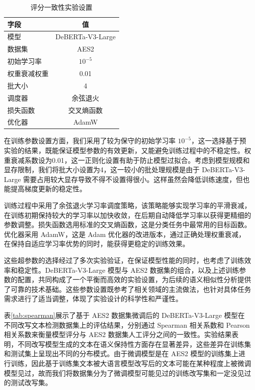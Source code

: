 \begin{table}[htbp]
\centering
\caption{评分一致性实验设置} \label{tab:score-set}
\begin{tabular}{lc}
\toprule
\textbf{字段}   & \textbf{值}   \\ \midrule
模型            & DeBERTa-V3-Large \cite{he2023debertav3improvingdebertausing} \\
数据集          & AES2 \cite{learning-agency-lab-automated-essay-scoring-2}     \\
初始学习率       & $10^{-5}$        \\
权重衰减权重     & 0.01             \\
批大小          & 4                \\
调度器          & 余弦退火           \\
损失函数        & 交叉熵函数         \\
优化器          & AdamW            \\ \bottomrule
\end{tabular}
\end{table}

在训练参数设置方面，我们采用了较为保守的初始学习率 $10^{-5}$，这一选择基于预实验的结果，既能保证模型参数的有效更新，又能避免训练过程中的不稳定性。权重衰减系数设为0.01，这一正则化设置有助于防止模型过拟合。考虑到模型规模和显存限制，我们将批大小设置为4，这一较小的批处理规模是由于 DeBERTa-V3-Large 需要占用较大显存导致不得不设置得很小。这样虽然会降低训练速度，但也能提高梯度更新的稳定性。

训练过程中采用了余弦退火学习率调度策略，该策略能够实现学习率的平滑衰减，在训练初期保持较大的学习率以加快收敛，在后期自动降低学习率以获得更精细的参数调整。损失函数选用标准的交叉熵函数，这是分类任务中最常用的目标函数。优化器采用 AdamW，这是 Adam 优化器的改进版本，通过正确处理权重衰减，在保持自适应学习率优势的同时，能获得更稳定的训练效果。

这些超参数的选择经过了多次实验验证，在保证模型性能的同时，也考虑了训练效率和稳定性。DeBERTa-V3-Large 模型与 AES2 数据集的组合，以及上述训练参数的配置，共同构成了一个平衡而高效的实验设置，为后续的语义相似性分析提供了可靠的技术基础。这些参数设置既参考了相关领域的主流做法，也针对具体任务需求进行了适当调整，体现了实验设计的科学性和严谨性。

表\ref{tab:spearman}展示了基于 AES2 数据集微调后的 DeBERTa-V3-Large 模型在不同改写文本检测数据集上的评估结果，分别通过 Spearman 相关系数和 Pearson 相关系数来衡量模型评分与 AES2 数据集人工评分之间的一致性。实验结果表明，不同改写模型生成的文本在语义保持性方面存在显著差异，这些差异在训练集和测试集上呈现出不同的分布模式。由于微调模型是在 AES2 模型的训练集上进行训练，因此基于训练集文本被大语言模型改写后的文本可能在某种程度上被微调模型见过，故而我们将数据集分为了微调模型可能见过的训练改写集和一定没见过的测试改写集。

